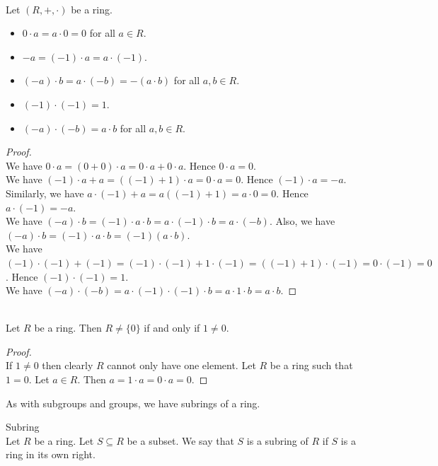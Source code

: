 \documentclass[a4paper]{article}
\begin{document}
\begin{lmm}{}{}\\
Let $(R,+,\cdot)$ be a ring. 
\begin{itemize}
\item $0\cdot a=a\cdot 0=0$ for all $a\in R$. 
\item $-a=(-1)\cdot a=a\cdot(-1)$. 
\item $(-a)\cdot b=a\cdot (-b)=-(a\cdot b)$ for all $a,b\in R$. 
\item $(-1)\cdot(-1)=1$. 
\item $(-a)\cdot (-b)=a\cdot b$ for all $a,b\in R$. 
\end{itemize}
\begin{proof}\\
We have $0\cdot a=(0+0)\cdot a=0\cdot a+0\cdot a$. Hence $0\cdot a=0$. \\

We have $(-1)\cdot a+a=((-1)+1)\cdot a=0\cdot a=0$. Hence $(-1)\cdot a=-a$. Similarly, we have $a\cdot(-1)+a=a((-1)+1)=a\cdot 0=0$. Hence $a\cdot(-1)=-a$. \\

We have $(-a)\cdot b=(-1)\cdot a\cdot b=a\cdot(-1)\cdot b=a\cdot(-b)$. Also, we have $(-a)\cdot b=(-1)\cdot a\cdot b=(-1)(a\cdot b)$. \\

We have $(-1)\cdot(-1)+(-1)=(-1)\cdot(-1)+1\cdot(-1)=((-1)+1)\cdot(-1)=0\cdot(-1)=0$. Hence $(-1)\cdot(-1)=1$. \\

We have $(-a)\cdot(-b)=a\cdot(-1)\cdot(-1)\cdot b=a\cdot 1\cdot b=a\cdot b$. 
\end{proof}
\end{lmm}

\begin{lmm}{}{}\\
Let $R$ be a ring. Then $R\neq\{0\}$ if and only if $1\neq 0$. 
\begin{proof}\\
If $1\neq 0$ then clearly $R$ cannot only have one element. Let $R$ be a ring such that $1=0$. Let $a\in R$. Then $a=1\cdot a=0\cdot a=0$. 
\end{proof}
\end{lmm}

As with subgroups and groups, we have subrings of a ring. 

\begin{defn}{Subring}{}\\
Let $R$ be a ring. Let $S\subseteq R$ be a subset. We say that $S$ is a subring of $R$ if $S$ is a ring in its own right. 
\end{defn}
\end{document}
